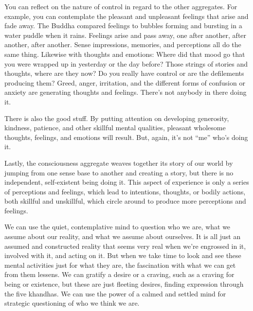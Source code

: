 You can reflect on the nature of control in regard to the other aggregates. For example, you can contemplate the pleasant and unpleasant feelings that arise and fade away. The Buddha compared feelings to bubbles forming and bursting in a water puddle when it rains. Feelings arise and pass away, one after another, after another, after another. Sense impressions, memories, and perceptions all do the same thing. Likewise with thoughts and emotions: Where did that mood go that you were wrapped up in yesterday or the day before? Those strings of stories and thoughts, where are they now? Do you really have control or are the defilements producing them? Greed, anger, irritation, and the different forms of confusion or anxiety are generating thoughts and feelings. There's not anybody in there doing it.

There is also the good stuff. By putting attention on developing generosity, kindness, patience, and other skillful mental qualities, pleasant wholesome thoughts, feelings, and emotions will result. But, again, it's not ``me'' who's doing it.

Lastly, the consciousness aggregate weaves together its story of our world by jumping from one sense base to another and creating a story, but there is no independent, self-existent being doing it. This aspect of experience is only a series of perceptions and feelings, which lead to intentions, thoughts, or bodily actions, both skillful and unskillful, which circle around to produce more perceptions and feelings.

We can use the quiet, contemplative mind to question who we are, what we assume about our reality, and what we assume about ourselves. It is all just an assumed and constructed reality that seems very real when we're engrossed in it, involved with it, and acting on it. But when we take time to look and see these mental activities just for what they are, the fascination with what we can get from them lessens. We can gratify a desire or a craving, such as a craving for being or existence, but these are just fleeting desires, finding expression through the five khandhas. We can use the power of a calmed and settled mind for strategic questioning of who we think we are.

